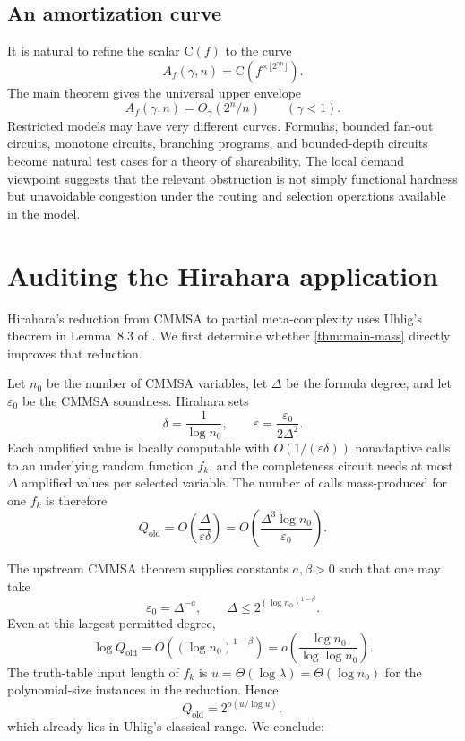 \documentclass[11pt]{article}
\theoremstyle{definition}
\newcommand{\C}{\mathrm{C}}
\newcommand{\eps}{\varepsilon}
\begin{document}
\subsection{An amortization curve}

It is natural to refine the scalar $\C(f)$ to the curve
\[
 A_f(\gamma,n)=\C\!\left(f^{\times\lfloor2^{\gamma n}\rfloor}\right).
\]
The main theorem gives the universal upper envelope
\[
 A_f(\gamma,n)=O_\gamma(2^n/n)
 \qquad(\gamma<1).
\]
Restricted models may have very different curves.  Formulas, bounded fan-out circuits, monotone circuits, branching programs, and bounded-depth circuits become natural test cases for a theory of shareability.  The local demand viewpoint suggests that the relevant obstruction is not simply functional hardness but unavoidable congestion under the routing and selection operations available in the model.

\section{Auditing the Hirahara application}

Hirahara's reduction from CMMSA to partial meta-complexity uses Uhlig's theorem in Lemma~8.3 of \cite{Hirahara2022}.  We first determine whether \cref{thm:main-mass} directly improves that reduction.

Let $n_0$ be the number of CMMSA variables, let $\Delta$ be the formula degree, and let $\eps_0$ be the CMMSA soundness.  Hirahara sets
\[
 \delta=\frac1{\log n_0},
 \qquad
 \eps=\frac{\eps_0}{2\Delta^2}.
\]
Each amplified value is locally computable with
$O(1/(\eps\delta))$ nonadaptive calls to an underlying random function $f_k$, and the completeness circuit needs at most $\Delta$ amplified values per selected variable.  The number of calls mass-produced for one $f_k$ is therefore
\begin{equation}\label{eq:hirahara-old-q}
 Q_{\mathrm{old}}
 =O\!\left(\frac{\Delta}{\eps\delta}\right)
 =O\!\left(\frac{\Delta^3\log n_0}{\eps_0}\right).
\end{equation}

The upstream CMMSA theorem supplies constants $a,\beta>0$ such that one may take
\[
 \eps_0=\Delta^{-a},
 \qquad
 \Delta\le2^{(\log n_0)^{1-\beta}}.
\]
Even at this largest permitted degree,
\[
 \log Q_{\mathrm{old}}
 =O((\log n_0)^{1-\beta})
 =o\!\left(\frac{\log n_0}{\log\log n_0}\right).
\]
The truth-table input length of $f_k$ is
$u=\Theta(\log\lambda)=\Theta(\log n_0)$ for the polynomial-size instances in the reduction.  Hence
\[
 Q_{\mathrm{old}}=2^{o(u/\log u)},
\]
which already lies in Uhlig's classical range.  We conclude:
\end{document}
